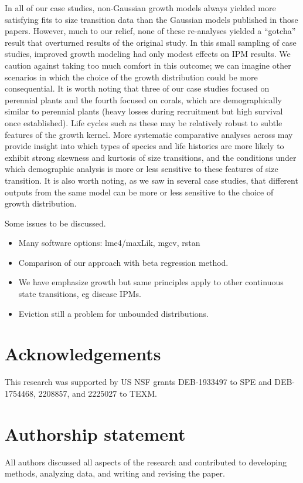 \documentclass[12pt]{article}
\begin{document}
In all of our case studies, non-Gaussian growth models always yielded more satisfying fits to size transition data than the Gaussian models published in those papers. 
However, much to our relief, none of these re-analyses yielded a ``gotcha'' result that overturned results of the original study. 
In this small sampling of case studies, improved growth modeling had only modest effects on IPM results. 
We caution against taking too much comfort in this outcome; we can imagine other scenarios in which the choice of the growth distribution could be more consequential. 
It is worth noting that three of our case studies focused on perennial plants and the fourth focused on corals, which are demographically similar to perennial plants (heavy losses during recruitment but high survival once established). 
Life cycles such as these may be relatively robust to subtle features of the growth kernel. 
More systematic comparative analyses across may provide insight into which types of species and life histories are more likely to exhibit strong skewness and kurtosis of size transitions, and the conditions under which demographic analysis is more or less sensitive to these features of size transition. 
It is also worth noting, as we saw in several case studies, that different outputs from the same model can be more or less sensitive to the choice of growth distribution. 


Some issues to be discussed.
\begin{itemize}
\item{Many software options: lme4/maxLik, mgcv, rstan}
\item{Comparison of our approach with beta regression method.}
\item{We have emphasize growth but same principles apply to other continuous state transitions, eg disease IPMs.}
\item{Eviction still a problem for unbounded distributions.}


\end{itemize}

\section*{Acknowledgements} 
This research was supported by US NSF grants DEB-1933497 to SPE and DEB-1754468, 2208857, and 2225027 to TEXM. 

\section{Authorship statement} 
All authors discussed all aspects of the research and contributed to developing methods, analyzing data, and writing and revising the paper.  
\end{document}
